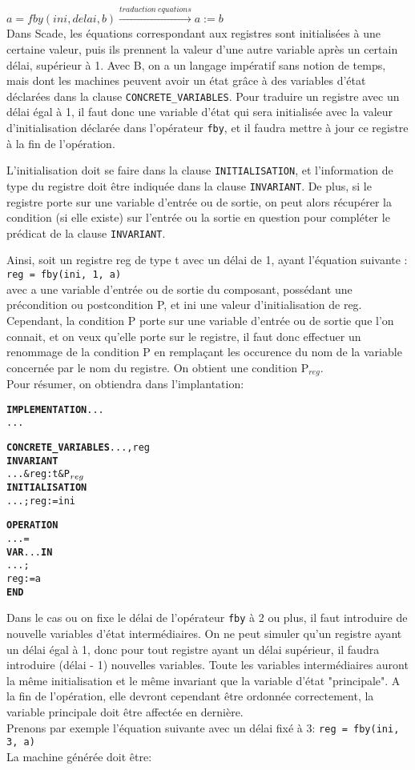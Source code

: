 \texttt{$a = fby(ini, delai, b) \xrightarrow{traduction ~ equations} a := b$ }\\

Dans Scade, les équations correspondant aux registres sont initialisées à une
certaine valeur, puis ils prennent la valeur d'une autre variable après un
certain délai, supérieur à 1.
Avec B, on a un langage impératif sans notion de temps, mais dont les machines
peuvent avoir un état grâce à des variables d'état déclarées dans la
clause \texttt{CONCRETE\_VARIABLES}. Pour traduire un registre avec un délai égal
à 1, il faut donc une variable d'état qui sera initialisée avec la valeur
d'initialisation déclarée dans l'opérateur \texttt{fby}, et il faudra mettre à
jour ce registre à la fin de l'opération.

L'initialisation doit se faire dans la clause \texttt{INITIALISATION}, et
l'information de type du registre doit être indiquée dans la
clause \texttt{INVARIANT}. De plus, si le registre porte sur une variable d'entrée ou de sortie,
on peut alors récupérer la condition (si elle existe) sur l'entrée ou la sortie
en question pour compléter le prédicat de la clause \texttt{INVARIANT}. 

Ainsi, soit un registre reg de type t avec un délai de 1, ayant l'équation suivante :\\
\texttt{reg = fby(ini, 1, a)} \\
avec a une variable d'entrée ou de sortie du composant, possédant une
précondition ou postcondition P, et ini une valeur d'initialisation de
reg. \\
Cependant, la condition P porte sur une variable d'entrée ou de sortie que l'on
connait, et on veux qu'elle porte sur le registre, il faut donc effectuer un
renommage de la condition P en remplaçant les occurence du nom de la variable
concernée par le nom du registre. On obtient une condition P$_{reg}$. \\
Pour résumer, on obtiendra dans l'implantation:

\begin{alltt}
\textbf{IMPLEMENTATION} ...
...

\textbf{CONCRETE\_VARIABLES} ..., reg
\textbf{INVARIANT}
  ...& reg : t & P\(\sb{reg}\)
\textbf{INITIALISATION}
  ... ; reg := ini

\textbf{OPERATION}
... =
\textbf{VAR} ... \textbf{IN}
  ...;
  reg := a
\textbf{END}
\end{alltt}

Dans le cas ou on fixe le délai de l'opérateur \texttt{fby} à 2 ou plus, il faut
introduire de nouvelle variables d'état intermédiaires. On ne peut simuler qu'un
registre ayant un délai égal à 1, donc pour tout registre ayant un délai
supérieur, il faudra introduire (délai - 1) nouvelles variables. Toute les
variables intermédiaires auront la même initialisation et le même invariant que
la variable d'état "principale". A la fin de l'opération, elle devront cependant
être ordonnée correctement, la variable principale doit être affectée en dernière.\\
Prenons par exemple l'équation suivante avec un délai fixé à 3:
\texttt{reg = fby(ini, 3, a)}\\
La machine générée doit être:

